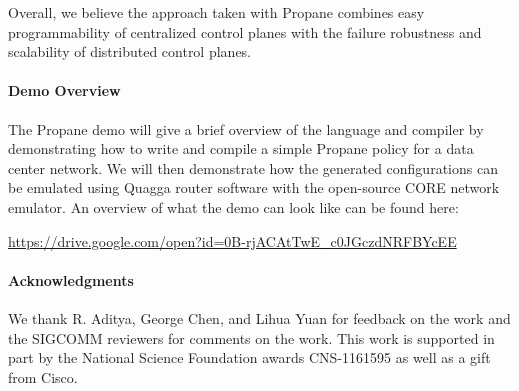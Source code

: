 \documentclass[10pt]{sig-alternate}
\newcommand{\sysname}{{\small \sf Propane}\xspace}
\newcommand{\para}[1]{\paragraph*{\textbf{#1}}}
\begin{document}
Overall, we believe the approach taken with \sysname combines easy programmability of centralized control planes with the failure robustness and scalability of distributed control planes.


\para{Demo Overview}
The \sysname demo will give a brief overview of the language and compiler by demonstrating how to write and compile a simple \sysname policy for a data center network. We will then demonstrate how the generated configurations can be emulated using Quagga router software with the open-source CORE network emulator. An overview of what the demo can look like can be found here:

\vspace{1em}
\begin{sloppypar}
\url{https://drive.google.com/open?id=0B-rjACAtTwE_c0JGczdNRFBYcEE}
\end{sloppypar}

\para{Acknowledgments}
We thank R. Aditya, George Chen, and Lihua Yuan for feedback on the work and the SIGCOMM reviewers for comments on the work. This work is supported in part by the National Science Foundation awards CNS-1161595 as well as a gift from Cisco.



\end{document}
